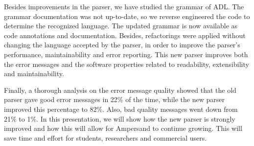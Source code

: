 Besides improvements in the parser, we have studied the grammar of ADL.
The grammar documentation was not up-to-date, so we reverse engineered the code to determine the recognized language.
The updated grammar is now available as code annotations and documentation.
Besides, refactorings were applied without changing the language accepted by the parser, in order to improve the parser's performance, maintainability and error reporting.
This new parser improves both the error messages and the software properties related to readability, extensibility and maintainability.

Finally, a thorough analysis on the error message quality showed that the old parser gave good error messages in 22\% of the time, while the new parser improved this percentage to 82\%.
Also, bad quality messages went down from 21\% to 1\%.
In this presentation, we will show how the new parser is strongly improved and how this will allow for Ampersand to continue growing.
This will save time and effort for students, researchers and commercial users.
